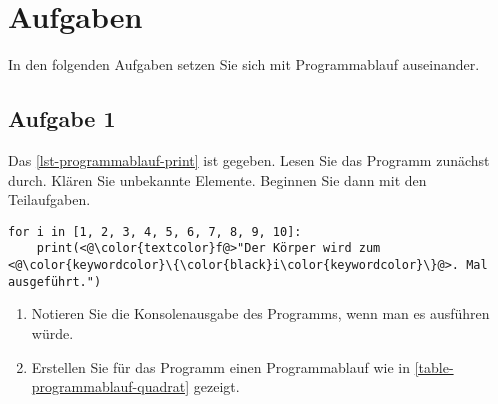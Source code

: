 \section{Aufgaben}

In den folgenden Aufgaben setzen Sie sich mit Programmablauf auseinander.

\subsection{Aufgabe 1}

Das \autoref{lst-programmablauf-print} ist gegeben. Lesen Sie das Programm zunächst durch. Klären Sie unbekannte Elemente.  Beginnen Sie dann mit den Teilaufgaben.

\begin{lstlisting}[caption={Das Programm erzeugt eine Ausgabe in der Konsole.}, label={lst-programmablauf-print}]
for i in [1, 2, 3, 4, 5, 6, 7, 8, 9, 10]:
    print(<@\color{textcolor}f@>"Der Körper wird zum <@\color{keywordcolor}\{\color{black}i\color{keywordcolor}\}@>. Mal ausgeführt.")
\end{lstlisting}

\begin{enumerate}
\item Notieren Sie die Konsolenausgabe des Programms, wenn man es ausführen würde.

\fillwithgrid{2.5in}

\item Erstellen Sie für das Programm einen Programmablauf wie in \autoref{table-programmablauf-quadrat} gezeigt.

\end{enumerate}

